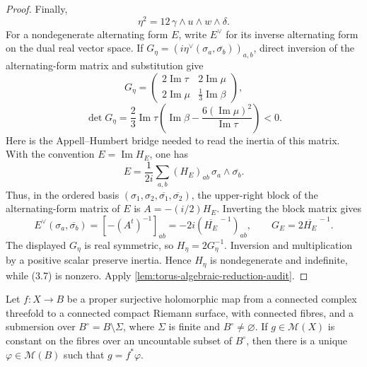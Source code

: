 \begin{proof}
Finally,
\[
 \eta^2=12\,\gamma\wedge u\wedge w\wedge\delta.
\tag{3.7}
\]
For a nondegenerate alternating form \(E\), write \(E^\vee\) for its
inverse alternating form on the dual real vector space.  If
\(G_\eta=(i\eta^\vee(\sigma_a,\overline{\sigma_b}))_{a,b}\), direct
inversion of the alternating-form matrix and substitution give
\[
G_\eta=
\begin{pmatrix}
2\operatorname{Im}\tau&2\operatorname{Im}\mu\\
2\operatorname{Im}\mu&\frac13\operatorname{Im}\beta
\end{pmatrix},
\]
\[
\det G_\eta=
\frac23\operatorname{Im}\tau
\left(\operatorname{Im}\beta-
\frac{6(\operatorname{Im}\mu)^2}{\operatorname{Im}\tau}\right)<0.
\tag{3.8}
\]
Here is the Appell--Humbert bridge needed to read the inertia of this
matrix.  With the convention \(E=\operatorname{Im}H_E\), one has
\[
 E=\frac1{2i}\sum_{a,b}(H_E)_{ab}\,
       \sigma_a\wedge\overline{\sigma_b}.
\]
Thus, in the ordered basis
\((\sigma_1,\sigma_2,\overline{\sigma_1},\overline{\sigma_2})\), the
upper-right block of the alternating-form matrix of \(E\) is
\(A=-(i/2)H_E\).  Inverting the block matrix gives
\[
 E^\vee(\sigma_a,\overline{\sigma_b})
   =[-(A^t)^{-1}]_{ab}
   =-2i(\overline{H_E}^{\,-1})_{ab},
 \qquad
 G_E=2\overline{H_E}^{\,-1}.
\tag{3.8a}
\]
The displayed \(G_\eta\) is real symmetric, so
\(H_\eta=2G_\eta^{-1}\).  Inversion and multiplication by a positive scalar
preserve inertia.  Hence \(H_\eta\) is nondegenerate and indefinite, while
(3.7) is nonzero.
Apply \cref{lem:torus-algebraic-reduction-audit}.
\end{proof}

\begin{lemma}
\label{lem:meromorphic-descent-audit}
Let \(f:X\to B\) be a proper surjective holomorphic map from a connected
complex threefold to a connected compact Riemann surface, with connected
fibres, and a submersion over
\(B^\circ=B\setminus\Sigma\), where \(\Sigma\) is finite and
\(B^\circ\ne\varnothing\).  If
\(g\in\mathcal M(X)\) is constant on the fibres over an uncountable subset
of \(B^\circ\), then there is a unique \(\varphi\in\mathcal M(B)\) such that
\(g=f^*\varphi\).
\end{lemma}


